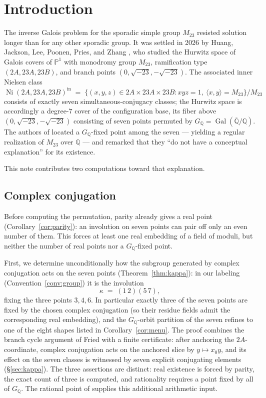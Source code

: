 \documentclass[11pt]{amsart}
\newcommand{\QQ}{\mathbb{Q}}
\newcommand{\PP}{\mathbb{P}}
\newcommand{\GQ}{G_{\QQ}}
\newcommand{\Ni}{\operatorname{Ni}}
\newcommand{\Mtw}{M_{23}}
\newcommand{\sqm}{\sqrt{-23}}
\newcommand{\kap}{\kappa}
\theoremstyle{plain}
\theoremstyle{definition}
\begin{document}
\section{Introduction}

The inverse Galois problem for the sporadic simple group $\Mtw$ resisted
solution longer than for any other sporadic group. It was settled in
2026 by Huang, Jackson, Lee, Poonen, Pries, and Zhang \cite{HJLPPZ},
who studied the Hurwitz space of Galois covers of $\PP^1$ with
monodromy group $\Mtw$, ramification type $(2A,23A,23B)$, and branch
points $(0,\sqm,-\sqm)$. The associated inner Nielsen class
\[
  \Ni(2A,23A,23B)^{\mathrm{in}}
  \;=\;
  \bigl\{(x,y,z)\in 2A\times 23A\times 23B :
     xyz=1,\ \langle x,y\rangle=\Mtw\bigr\}\big/\Mtw
\]
consists of exactly seven simultaneous-conjugacy classes; the Hurwitz
space is accordingly a degree-$7$ cover of the configuration base, its
fiber above $(0,\sqm,-\sqm)$ consisting of seven points permuted by
$\GQ=\operatorname{Gal}(\overline{\QQ}/\QQ)$. The authors of
\cite{HJLPPZ} located a $\GQ$-fixed point among the seven --- yielding a
regular realization of $\Mtw$ over $\QQ$ --- and remarked that they
``do not have a conceptual explanation'' for its existence.

This note contributes two computations toward that explanation.

\subsection*{Complex conjugation}
Before computing the permutation, parity already gives a real point
(Corollary~\ref{cor:parity}): an involution on seven points can pair
off only an even number of them. This forces at least one real
embedding of a field of moduli, but neither the number of real
points nor a $\GQ$-fixed point.

First, we determine unconditionally how the subgroup generated by
complex conjugation acts on the seven points
(Theorem~\ref{thm:kappa}): in our labeling
(Convention~\ref{conv:group}) it is the involution
\[
  \kap \;=\; (1\,2)(5\,7),
\]
fixing the three points $3,4,6$. In particular exactly three of the
seven points are fixed by the chosen complex conjugation (so their
residue fields admit the corresponding real embedding), and the
$\GQ$-orbit partition of the seven refines to one of the eight shapes
listed in Corollary~\ref{cor:menu}. The proof combines the branch cycle argument
of Fried \cite{Fried77, DebesDouai} with a finite certificate: after
anchoring the $2A$-coordinate, complex conjugation acts on the
anchored slice by $y \mapsto x_0y$, and its effect on the seven
classes is witnessed by seven explicit conjugating elements
(\S\ref{sec:kappa}).
The three assertions are distinct: real existence is forced by
parity, the exact count of three is computed, and rationality
requires a point fixed by all of $\GQ$. The rational point of
\cite{HJLPPZ} supplies this additional arithmetic input.
\end{document}
